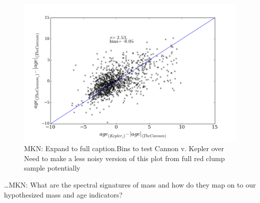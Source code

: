 \documentclass[12pt, preprint]{aastex}
\begin{document}
\begin{figure}[p!]
\centering
    \includegraphics[scale=0.31]{./plots/delta_age_2.png}
    \caption{MKN: Expand to full caption.Bins to test Cannon v. Kepler over  Need to make a less noisy version of this plot from full red clump sample potentially  }
\label{fig:alphabins}
\end{figure}

\ldots MKN: What are the spectral signatures of mass and how do they
map on to our hypothesized mass and age indicators?
\end{document}
